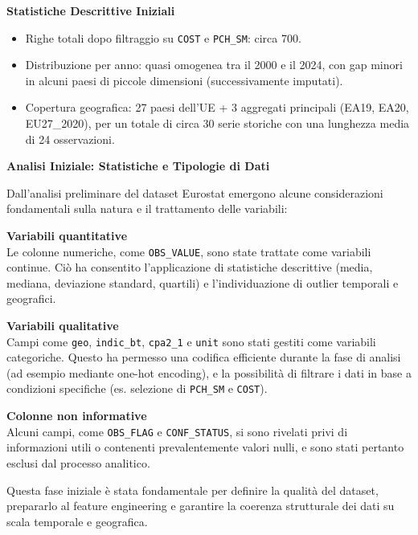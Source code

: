\documentclass[conference]{IEEEtran}
\begin{document}
\begin{enumerate}
\vspace{1em} \noindent\textbf{Statistiche Descrittive Iniziali} \begin{itemize} \item Righe totali dopo filtraggio su \texttt{COST} e \texttt{PCH\_SM}: circa 700. \item Distribuzione per anno: quasi omogenea tra il 2000 e il 2024, con gap minori in alcuni paesi di piccole dimensioni (successivamente imputati). \item Copertura geografica: 27 paesi dell’UE + 3 aggregati principali (EA19, EA20, EU27\_2020), per un totale di circa 30 serie storiche con una lunghezza media di 24 osservazioni. \end{itemize}
\end{enumerate}

\vspace{1em} \noindent\textbf{Analisi Iniziale: Statistiche e Tipologie di Dati} 

Dall’analisi preliminare del dataset Eurostat emergono alcune considerazioni fondamentali sulla natura e il trattamento delle variabili:

\vspace{1em}
\noindent\textbf{Variabili quantitative} \\
Le colonne numeriche, come \texttt{OBS\_VALUE}, sono state trattate come variabili continue. Ciò ha consentito l’applicazione di statistiche descrittive (media, mediana, deviazione standard, quartili) e l’individuazione di outlier temporali e geografici.

\vspace{0.5em}
\noindent\textbf{Variabili qualitative} \\
Campi come \texttt{geo}, \texttt{indic\_bt}, \texttt{cpa2\_1} e \texttt{unit} sono stati gestiti come variabili categoriche. Questo ha permesso una codifica efficiente durante la fase di analisi (ad esempio mediante one-hot encoding), e la possibilità di filtrare i dati in base a condizioni specifiche (es. selezione di \texttt{PCH\_SM} e \texttt{COST}).

\vspace{0.5em}
\noindent\textbf{Colonne non informative} \\
Alcuni campi, come \texttt{OBS\_FLAG} e \texttt{CONF\_STATUS}, si sono rivelati privi di informazioni utili o contenenti prevalentemente valori nulli, e sono stati pertanto esclusi dal processo analitico.

\vspace{1em}
Questa fase iniziale è stata fondamentale per definire la qualità del dataset, prepararlo al feature engineering e garantire la coerenza strutturale dei dati su scala temporale e geografica.
\end{document}
